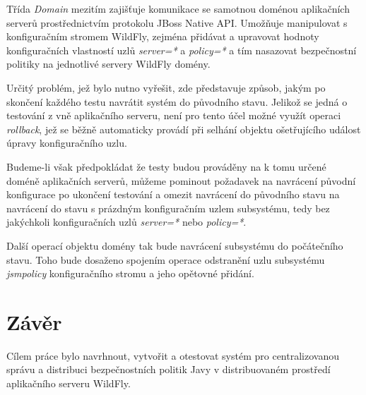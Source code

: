 Třída {\it Domain} mezitím zajišťuje komunikace se samotnou doménou aplikačních serverů prostřednictvím protokolu JBoss Native API. Umožňuje manipulovat s konfiguračním stromem WildFly, zejména přidávat a upravovat hodnoty konfiguračních vlastností uzlů {\it server=*} a {\it policy=*} a tím nasazovat bezpečnostní politiky na jednotlivé servery WildFly domény.

Určitý problém, jež bylo nutno vyřešit, zde představuje způsob, jakým po skončení každého testu navrátit systém do původního stavu. Jelikož se jedná o testování z vně aplikačního serveru, není pro tento účel možné využít operaci {\it rollback}, jež se běžně automaticky provádí při selhání objektu ošetřujícího událost úpravy konfiguračního uzlu.

Budeme-li však předpokládat že testy budou prováděny na k tomu určené doméně aplikačních serverů, můžeme pominout požadavek na navrácení původní konfigurace po ukončení testování a omezit navrácení do původního stavu na navrácení do stavu s prázdným konfiguračním uzlem subsystému, tedy bez jakýchkoli konfiguračních uzlů 
{\it server=*} nebo {\it policy=*}.

Další operací objektu domény tak bude navrácení subsystému do počátečního stavu. Toho bude dosaženo spojením operace odstranění uzlu subsystému {\it jsmpolicy} konfiguračního stromu a jeho opětovné přidání.

\chapter{Závěr}

Cílem práce bylo navrhnout, vytvořit a otestovat systém pro centralizovanou správu a distribuci bezpečnostních politik Javy v distribuovaném prostředí aplikačního serveru WildFly.


